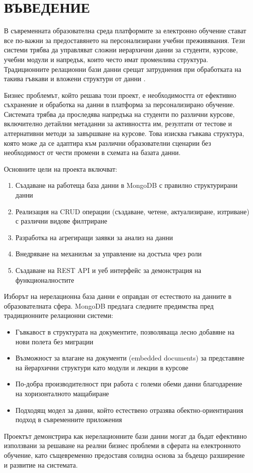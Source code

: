 
\section{ВЪВЕДЕНИЕ}

В съвременната образователна среда платформите за електронно обучение стават все по-важни за предоставянето на персонализирани учебни преживявания. Тези системи трябва да управляват сложни иерархични данни за студенти, курсове, учебни модули и напредък, които често имат променлива структура. Традиционните релационни бази данни срещат затруднения при обработката на такива гъвкави и вложени структури от данни \cite{sadalage2012nosql}.

Бизнес проблемът, който решава този проект, е необходимостта от ефективно съхранение и обработка на данни в платформа за персонализирано обучение. Системата трябва да проследява напредъка на студенти по различни курсове, включително детайлни метаданни за активността им, резултати от тестове и алтернативни методи за завършване на курсове. Това изисква гъвкава структура, която може да се адаптира към различни образователни сценарии без необходимост от чести промени в схемата на базата данни.

Основните цели на проекта включват:
\begin{enumerate}
    \item Създаване на работеща база данни в MongoDB с правилно структурирани данни \cite{mongodb_docs}
    \item Реализация на CRUD операции (създаване, четене, актуализиране, изтриване) с различни видове филтриране
    \item Разработка на агрегиращи заявки за анализ на данни
    \item Внедряване на механизъм за управление на достъпа чрез роли
    \item Създаване на REST API и уеб интерфейс за демонстрация на функционалностите
\end{enumerate}

Изборът на нерелационна база данни е оправдан от естеството на данните в образователната сфера. MongoDB предлага следните предимства пред традиционните релационни системи:
\begin{itemize}
    \item Гъвкавост в структурата на документите, позволяваща лесно добавяне на нови полета без миграции
    \item Възможност за влагане на документи (embedded documents) за представяне на йерархични структури като модули и лекции в курсове
    \item По-добра производителност при работа с големи обеми данни благодарение на хоризонталното мащабиране
    \item Подходящ модел за данни, който естествено отразява обектно-ориентирания подход в съвременните приложения
\end{itemize}

Проектът демонстрира как нерелационните бази данни могат да бъдат ефективно използвани за решаване на реални бизнес проблеми в сферата на електронното обучение, като същевременно предоставя солидна основа за бъдещо разширение и развитие на системата.

